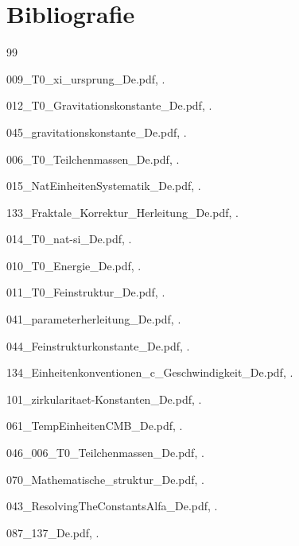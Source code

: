 	
	
	\section{Bibliografie}
	
	\begin{thebibliography}{99}
		
		009\_T0\_xi\_ursprung\_De.pdf, .
		
		012\_T0\_Gravitationskonstante\_De.pdf, .
		
		045\_gravitationskonstante\_De.pdf, .
		
		006\_T0\_Teilchenmassen\_De.pdf, .
		
		015\_NatEinheitenSystematik\_De.pdf, .
		
		133\_Fraktale\_Korrektur\_Herleitung\_De.pdf, .
		
		014\_T0\_nat-si\_De.pdf, .
		
		010\_T0\_Energie\_De.pdf, .
		
		011\_T0\_Feinstruktur\_De.pdf, .
		
		041\_parameterherleitung\_De.pdf, .
		
		044\_Feinstrukturkonstante\_De.pdf, .
		
		134\_Einheitenkonventionen\_c\_Geschwindigkeit\_De.pdf, .
		
		101\_zirkularitaet-Konstanten\_De.pdf, .
		
		061\_TempEinheitenCMB\_De.pdf, .
		
		046\_006\_T0\_Teilchenmassen\_De.pdf, .
		
		070\_Mathematische\_struktur\_De.pdf, .
		
		043\_ResolvingTheConstantsAlfa\_De.pdf, .
		
		087\_137\_De.pdf, .
		
	\end{thebibliography}
	